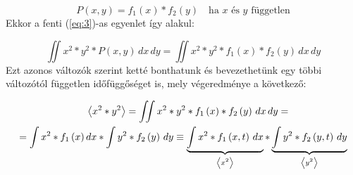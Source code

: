 \begin{equation}
    P \left( x, y \right) = f_{1} \left( x \right) * f_{2} \left( y \right) \quad \text{ha $x$ és $y$ független}
\end{equation}
Ekkor a fenti (\ref{eq:3})-as egyenlet így alakul:

\begin{equation} \label{eq:4}
    \iint{x^{2} * y^{2} * P \left( x, y \right)\, dx\, dy}
    =
    \iint{x^{2} * y^{2} * f_{1} \left( x \right) * f_{2} \left( y \right)\, dx\, dy}
\end{equation}
Ezt azonos változók szerint ketté bonthatunk és bevezethetünk egy többi változótól független időfüggőséget is, mely végeredménye a következő:

\begin{align} \label{eq:5}
    &\left< x^{2} * y^{2} \right>
    =
    \iint{x^{2} * y^{2} * f_{1} \left( x \right) * f_{2} \left( y \right)\, dx\, dy} = \nonumber \\
    =
    \int x^{2} * f_{1} \left( x \right)\, &dx * \int{y^{2} * f_{2} \left( y \right)\, dy}
    \equiv
    \underbrace{\int{x^{2} * f_{1} \left( x, t \right)\, dx}}_{\text{\normalfont $\left< x^{2} \right>$}} * \underbrace{\int{y^{2} * f_{2} \left( y, t \right)\, dy}}_{\text{\normalfont $\left< y^{2} \right>$}}
\end{align}

\subsection{}